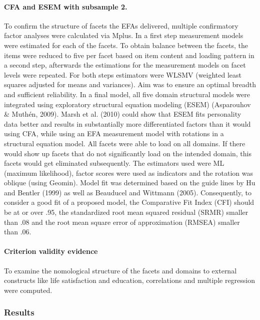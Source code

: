 \documentclass[,man]{apa6}
\let\oldparagraph\paragraph
\renewcommand{\paragraph}[1]{\oldparagraph{#1}\mbox{}}
\theoremstyle{definition}
\theoremstyle{definition}
\theoremstyle{definition}
\theoremstyle{remark}
\begin{document}
\hypertarget{cfa-and-esem-with-subsample-2.}{%
\paragraph{CFA and ESEM with subsample
2.}\label{cfa-and-esem-with-subsample-2.}}

To confirm the structure of facets the EFAs delivered, multiple
confirmatory factor analyses were calculated via Mplus. In a first step
measurement models were estimated for each of the facets. To obtain
balance between the facets, the items were reduced to five per facet
based on item content and loading pattern in a second step, afterwards
the estimations for the measurement models on facet levels were
repeated. For both steps estimators were WLSMV (weighted least squares
adjusted for means and variances). Aim was to ensure an optimal breadth
and sufficient reliability. In a final model, all five domain structural
models were integrated using exploratory structural equation modeling
(ESEM) (Asparouhov \& Muthén, 2009). Marsh et al. (2010) could show that
ESEM fits personality data better and results in substantially more
differentiated factors than it would using CFA, while using an EFA
measurement model with rotations in a structural equation model. All
facets were able to load on all domains. If there would show up facets
that do not significantly load on the intended domain, this facets would
get eliminated subsequently. The estimators used were ML (maximum
likelihood), factor scores were used as indicators and the rotation was
oblique (using Geomin). Model fit was determined based on the guide
lines by Hu and Bentler (1999) as well as Beauducel and Wittmann (2005).
Consequently, to consider a good fit of a proposed model, the
Comparative Fit Index (CFI) should be at or over .95, the standardized
root mean squared residual (SRMR) smaller than .08 and the root mean
square error of approximation (RMSEA) smaller than .06.

\hypertarget{criterion-validity-evidence}{%
\paragraph{Criterion validity
evidence}\label{criterion-validity-evidence}}

To examine the nomological structure of the facets and domains to
external constructs like life satisfaction and education, correlations
and multiple regression were computed.

\hypertarget{results}{%
\subsubsection{Results}\label{results}}
\end{document}
